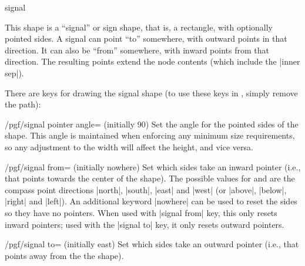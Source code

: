 \begin{shape}{signal}

	This shape is a ``signal'' or sign shape, that is, a rectangle, with
	optionally pointed sides. A signal can point ``to'' somewhere, with
	outward points in that direction. It can also be ``from''
	somewhere, with inward points from that direction. The resulting
	points extend the node contents (which include the |inner sep|).
	
\begin{codeexample}[]
\end{codeexample}

	There are \pgfname{} keys for drawing the signal shape (to use these
	keys in \tikzname{}, simply remove the  path):
	
	\begin{key}{/pgf/signal pointer angle= (initially 90)}
		Set the angle for the pointed sides of the shape. This angle is
		maintained when enforcing any minimum size requirements, so
		any adjustment to the width will affect the height, and vice versa.
	\end{key}
	
	\begin{key}{/pgf/signal from=\space{} (initially nowhere)}
		Set which sides take an inward pointer (i.e., that points towards the
		center of the shape). The possible values for  and
		 are the compass point directions |north|,
		|south|, |east| and |west| (or |above|, |below|, |right| and |left|).
		An additional keyword |nowhere| can be used to reset the sides so
		they have no pointers. When used with |signal from| key, this only
		resets inward pointers;	used with the |signal to| key, it only
		resets outward pointers.
		
	\end{key}
	
	\begin{key}{/pgf/signal to=\space{} (initially east)}
		Set which sides take an outward pointer (i.e., that points away from
		the	the shape).
	\end{key}
	

\end{shape}
